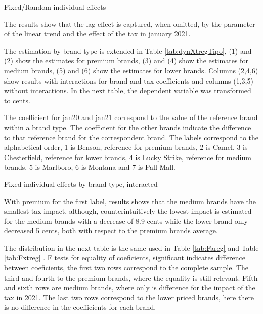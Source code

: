 \documentclass[]{article}
\begin{document}
	\begin{table}[ht]
		\centering
		\caption{Fixed/Random individual effects \label{tab:dynXtreg}} 
		
%
	\end{table}

The results show that the lag effect is captured, when omitted, by the parameter of the linear trend and the effect of the tax in january 2021.

The estimation by brand type is extended in Table \ref{tab:dynXtregTipo}, (1) and (2) show the estimates for premium brands, (3) and (4) show the estimates for medium brands, (5) and (6) show the estimates for lower brands.  Columns (2,4,6) show results with interactions for brand and tax coefficients and columns (1,3,5) without interactions.
In the next table, the dependent variable was transformed to cents.

The coefficient for jan20 and jan21 correspond to the value of the reference brand within a brand type.
The coefficient for the other brands indicate the difference to that reference brand for the correspondent brand. The labels correspond to the alphabetical order, 1 is Benson, reference for premium brands, 2 is Camel, 3 is Chesterfield, reference for lower brands, 4 is Lucky Strike, reference for medium brands, 5 is Marlboro, 6 is Montana and 7 is Pall Mall.

\begin{table}[ht]
	\centering
	\caption{Fixed individual effects by brand type, interacted \label{tab:dynXtregTipo}} 

%
\end{table}

With premium for the first label, results shows that the medium brands have the smallest tax impact, although, counterintuitively the lowest impact is estimated for the medium brands with a decrease of 8.9 cents while the lower brand only decreased 5 cents, both with respect to the premium brands average. 

The distribution in the next table is the same used in Table \ref{tab:Fareg} and Table \ref{tab:Fxtreg} . F tests for equality of coeficients, significant indicates difference between coeficients, the first two rows correspond to the complete sample. The third and fourth to the premium brands, where the equality is still relevant. Fifth and sixth rows are medium brands, where only is difference for the impact of the tax in 2021. The last two rows correspond to the lower priced brands, here there is no difference in the coefficients for each brand.
\end{document}
